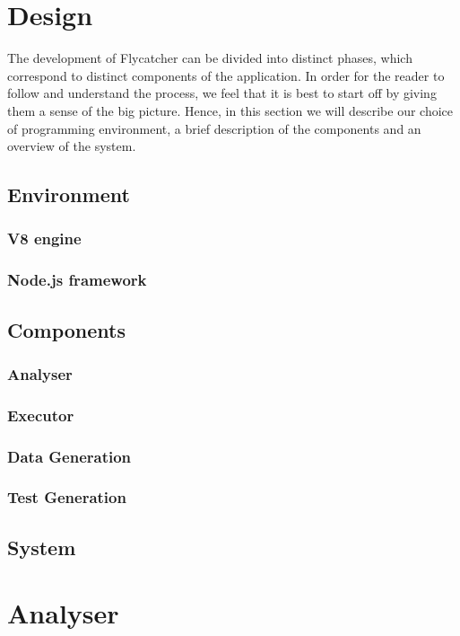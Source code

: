 \chapter{Design}
The development of Flycatcher can be divided into distinct phases, which correspond to distinct components of the application. In order for the reader to follow and understand the process, we feel that it is best to start off by giving them a sense of the big picture. Hence, in this section we will describe our choice of programming environment, a brief description of the components and an overview of the system.

\section{Environment}
\subsection{V8 engine}
\subsection{Node.js framework}

\section{Components}
\subsection{Analyser}
\subsection{Executor}
\subsection{Data Generation}
\subsection{Test Generation}

\section{System}



\chapter{Analyser}
